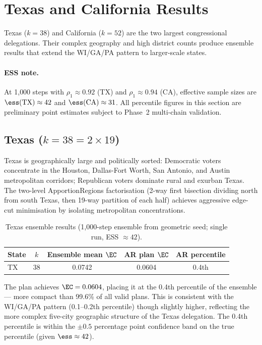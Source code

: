\section{Texas and California Results}
\label{sec:tx-ca}

Texas ($k = 38$) and California ($k = 52$) are the two largest congressional delegations. Their complex geography and high district counts produce ensemble results that extend the WI/GA/PA pattern to larger-scale states.

\paragraph{ESS note.}
At 1{,}000 steps with $\rho_1 \approx 0.92$ (TX) and $\rho_1 \approx 0.94$ (CA),
effective sample sizes are $\ess(\mathrm{TX}) \approx 42$ and $\ess(\mathrm{CA}) \approx 31$.
All percentile figures in this section are preliminary point estimates subject to Phase~2 multi-chain validation.

\subsection{Texas ($k = 38 = 2 \times 19$)}

Texas is geographically large and politically sorted: Democratic voters concentrate in the Houston, Dallas-Fort Worth, San Antonio, and Austin metropolitan corridors; Republican voters dominate rural and exurban Texas. The two-level ApportionRegions factorisation (2-way first bisection dividing north from south Texas, then 19-way partition of each half) achieves aggressive edge-cut minimisation by isolating metropolitan concentrations.

\begin{table}[h]
\centering
\caption{Texas ensemble results (1{,}000-step \recom{} ensemble from geometric seed; single run, ESS $\approx 42$).}
\label{tab:tx-results}
\begin{tabular}{lcccc}
\toprule
State & $k$ & Ensemble mean $\EC$ & AR plan $\EC$ & AR percentile \\
\midrule
TX & 38 & 0.0742 & 0.0604 & 0.4th \\
\bottomrule
\end{tabular}
\end{table}

The \ar{} plan achieves $\EC = 0.0604$, placing it at the 0.4th percentile of the ensemble --- more compact than 99.6\% of all valid \recom{} plans. This is consistent with the WI/GA/PA pattern (0.1--0.2th percentile) though slightly higher, reflecting the more complex five-city geographic structure of the Texas delegation. The 0.4th percentile is within the $\pm 0.5$ percentage point confidence band on the true percentile (given $\ess \approx 42$).

